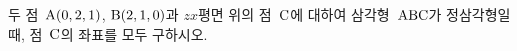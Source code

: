 두 점~$\mathrm{A}(0{,}\mkern3mu\mathopen{}2{,}\mkern3mu\mathopen{}1)$, $\mathrm{B}(2{,}\mkern3mu\mathopen{}1{,}\mkern3mu\mathopen{}0)$과 $zx$평면 위의 점~$\mathrm{C}$에 대하여 삼각형~$\mathrm{ABC}$가 정삼각형일 때, 점~$\mathrm{C}$의 좌표를 모두 구하시오.
